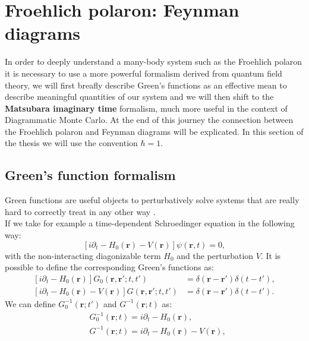 \section{Froehlich polaron: Feynman diagrams}
In order to deeply understand a many-body system such as the Froehlich polaron it is necessary to use a more powerful formalism 
derived from quantum field theory, we will first breafly describe Green's functions as an effective mean to describe meaningful quantities of 
our system and we will then shift to the \textbf{Matsubara imaginary time} formalism, much more useful in the context of Diagrammatic Monte Carlo.
At the end of this journey the connection between the Froehlich polaron and Feynman diagrams will be explicated. In this section of the thesis 
we will use the convention $\hbar=1$.
\subsection{Green's function formalism}
Green functions are useful objects to perturbatively solve systems that are really hard to correctly treat in any other way \cite{bruus2004many}.\\
If we take for example a time-dependent Schroedinger equation in the following way:
\begin{equation}
    \left[i\partial_t - H_0(\mathbf{r})-V(\mathbf{r})\right]\psi(\mathbf{r},t)=0,
    \label{Schroedinger_eq_hamiltonian}
\end{equation}
with the non-interacting diagonizable term $H_0$ and the perturbation $V$. It is possible to define the corresponding Green's functions as:
\begin{equation}
\begin{split}
    \left[i\partial_t -H_0(\mathbf{r})\right]G_0(\mathbf{r},\mathbf{r}';t,t')&=\delta(\mathbf{r}-\mathbf{r}')\delta(t-t'),\\
    \left[i\partial_t -H_0(\mathbf{r})-V(\mathbf{r})\right]G(\mathbf{r},\mathbf{r}';t,t')&=\delta(\mathbf{r}-\mathbf{r}')\delta(t-t').
\end{split}
\end{equation}
We can define $G_0^{-1}(\mathbf{r};t')$ and $G^{-1}(\mathbf{r};t)$ as:
\begin{equation}
\begin{split}
    &G_0^{-1}(\mathbf{r};t)=i\partial_t-H_0(\mathbf{r}),\\
    &G^{-1}(\mathbf{r};t)=i\partial_t-H_0(\mathbf{r})-V(\mathbf{r}),
\end{split}
\label{GF_solving_eq}
\end{equation}
